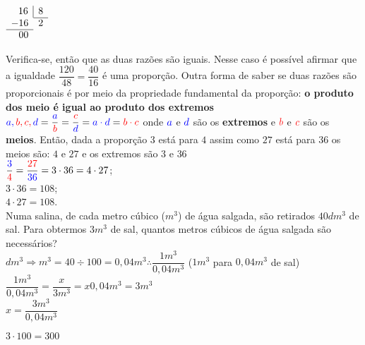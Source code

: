 \begin{enumerate}
\begin{multicols}{3}
	\columnbreak
	$
	\begin{array}{l l r r}
	\multicolumn{2}{r}{16} \vline & \multicolumn{2}{l}{8} \\ \cline{3-4}
	\multicolumn{2}{l}{-16} & \multicolumn{2}{l}{2} \\ \cline{1-2}
	\multicolumn{2}{r}{00} &  \\
	\end{array}
	$
\end{multicols}

Verifica-se, então que as duas razões são iguais. Nesse caso é possível afirmar que a igualdade $ \dfrac{120}{48} = \dfrac{40}{16} $ é uma proporção. Outra forma de saber se duas razões são proporcionais é por meio da propriedade fundamental da proporção: \textbf{o produto dos meio é igual ao produto dos extremos}\\

$ \color{blue}a, \color{red}b, \color{red}c, \color{blue}d \color{black}= \dfrac{\color{blue}a}{\color{red}b} = \dfrac{\color{red}c}{\color{blue}d} = \color{blue}a \cdot \color{blue}d \color{black}= \color{red}b \cdot \color{red}c$ onde $ \color{blue}a $ e $ \color{blue}d $ são os \textbf{extremos} e $ \color{red}b $ e $ \color{red}c $ são os \textbf{meios}. Então, dada a proporção $ 3 $ está para $ 4 $ assim como $ 27 $ está para $ 36 $ os meios são: $ 4 $ e $ 27 $ e os extremos são $ 3 $ e $ 36 $\\

$ \dfrac{\color{blue}3}{\color{red}4} = \dfrac{\color{red}27}{\color{blue}36} = 3 \cdot 36 = 4 \cdot 27$;\\

$ 3 \cdot 36 = 108$;\\
$ 4 \cdot 27 = 108 $.\\

Numa salina, de cada metro cúbico ($ m^3 $) de água salgada, são retirados $ 40 dm^3 $ de sal. Para obtermos $ 3m^3 $ de sal, quantos metros cúbicos de água salgada são necessários?\\

$ dm^3 \Rightarrow m^3 = 40 \div 100 = 0,04m^3 \therefore \dfrac{1m^3}{0,04m^3}$ ($ 1m^3 $ para $ 0,04m^3 $ de sal)\\

$ \dfrac{1m^3}{0,04m^3} = \dfrac{x}{3m^3} = x0,04m^3 = 3m^3 $\\

$ x = \dfrac{3m^3}{0,04m^3}$\\

\begin{multicols}{3}
$ 3 \cdot 100 = 300$\\


\end{multicols}
\end{enumerate}
